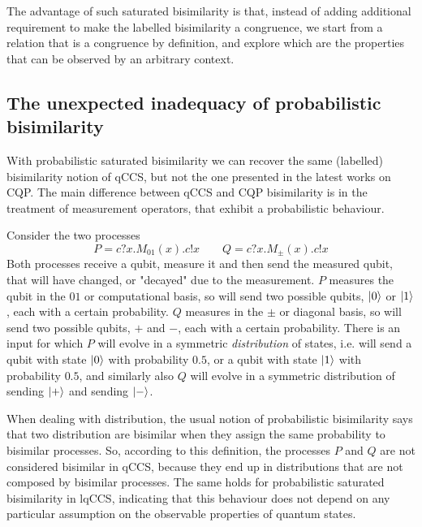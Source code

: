 The advantage of such saturated bisimilarity is that, instead of adding additional requirement to make the labelled bisimilarity a congruence, we start from a relation that is a congruence by definition, and explore which are the properties that can be observed by an arbitrary context.


\subsection*{The unexpected inadequacy of probabilistic bisimilarity}

With probabilistic saturated bisimilarity we can recover the same (labelled) bisimilarity notion of qCCS, but not the one presented in the latest works on CQP. The main difference between qCCS and CQP bisimilarity is in the treatment of measurement operators, that exhibit a probabilistic behaviour.

Consider the two processes 
\[P = c?x.M_{01}(x).c!x \qquad Q = c?x.M_\pm(x).c!x\]
Both processes receive a qubit, measure it and then send the measured qubit, that will have changed, or "decayed" due to the measurement. $P$ measures the qubit in the $01$ or computational basis, so will send two possible qubits, $\ket{0}$ or $\ket{1}$, each with a certain probability. $Q$ measures in the $\pm$ or diagonal basis, so will send two possible qubits, $+$ and $-$, each with a certain probability. There is an input for which $P$ will evolve in a symmetric \textit{distribution} of states, i.e. will send a qubit with state $\ket{0}$ with probability $0.5$, or a qubit with state $\ket{1}$ with probability $0.5$, and similarly also $Q$ will evolve in a symmetric distribution of sending $\ket{+}$ and sending $\ket{-}$.

When dealing with distribution, the usual notion of  probabilistic bisimilarity says that two distribution are bisimilar when they assign the same probability to bisimilar processes. So, according to this definition, the processes $P$ and $Q$ are not considered bisimilar in qCCS, because they end up in distributions that are not composed by bisimilar processes. The same holds for probabilistic saturated bisimilarity in lqCCS, indicating that this behaviour does not depend on any particular assumption on the observable properties of quantum states.

